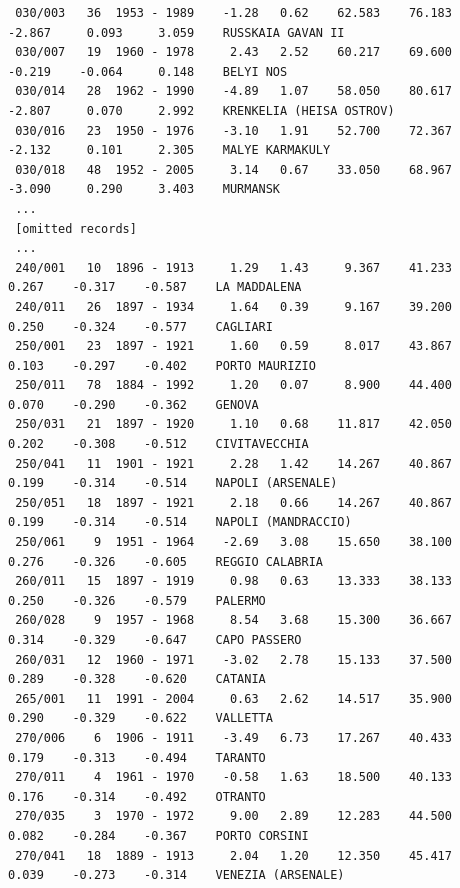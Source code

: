 \documentclass[11pt,fleqn,a4paper,titlepage]{article}
\begin{document}
\begin{table}[h]
{{\begin{verbatim}
 030/003   36  1953 - 1989    -1.28   0.62    62.583    76.183    -2.867     0.093     3.059    RUSSKAIA GAVAN II             
 030/007   19  1960 - 1978     2.43   2.52    60.217    69.600    -0.219    -0.064     0.148    BELYI NOS                     
 030/014   28  1962 - 1990    -4.89   1.07    58.050    80.617    -2.807     0.070     2.992    KRENKELIA (HEISA OSTROV)      
 030/016   23  1950 - 1976    -3.10   1.91    52.700    72.367    -2.132     0.101     2.305    MALYE KARMAKULY               
 030/018   48  1952 - 2005     3.14   0.67    33.050    68.967    -3.090     0.290     3.403    MURMANSK                      
 ...
 [omitted records]
 ...
 240/001   10  1896 - 1913     1.29   1.43     9.367    41.233     0.267    -0.317    -0.587    LA MADDALENA                  
 240/011   26  1897 - 1934     1.64   0.39     9.167    39.200     0.250    -0.324    -0.577    CAGLIARI                      
 250/001   23  1897 - 1921     1.60   0.59     8.017    43.867     0.103    -0.297    -0.402    PORTO MAURIZIO                
 250/011   78  1884 - 1992     1.20   0.07     8.900    44.400     0.070    -0.290    -0.362    GENOVA                        
 250/031   21  1897 - 1920     1.10   0.68    11.817    42.050     0.202    -0.308    -0.512    CIVITAVECCHIA                 
 250/041   11  1901 - 1921     2.28   1.42    14.267    40.867     0.199    -0.314    -0.514    NAPOLI (ARSENALE)             
 250/051   18  1897 - 1921     2.18   0.66    14.267    40.867     0.199    -0.314    -0.514    NAPOLI (MANDRACCIO)           
 250/061    9  1951 - 1964    -2.69   3.08    15.650    38.100     0.276    -0.326    -0.605    REGGIO CALABRIA               
 260/011   15  1897 - 1919     0.98   0.63    13.333    38.133     0.250    -0.326    -0.579    PALERMO                       
 260/028    9  1957 - 1968     8.54   3.68    15.300    36.667     0.314    -0.329    -0.647    CAPO PASSERO                  
 260/031   12  1960 - 1971    -3.02   2.78    15.133    37.500     0.289    -0.328    -0.620    CATANIA                       
 265/001   11  1991 - 2004     0.63   2.62    14.517    35.900     0.290    -0.329    -0.622    VALLETTA                      
 270/006    6  1906 - 1911    -3.49   6.73    17.267    40.433     0.179    -0.313    -0.494    TARANTO                       
 270/011    4  1961 - 1970    -0.58   1.63    18.500    40.133     0.176    -0.314    -0.492    OTRANTO                       
 270/035    3  1970 - 1972     9.00   2.89    12.283    44.500     0.082    -0.284    -0.367    PORTO CORSINI                 
 270/041   18  1889 - 1913     2.04   1.20    12.350    45.417     0.039    -0.273    -0.314    VENEZIA (ARSENALE)            

\end{verbatim}}}
\end{table}
\end{document}
